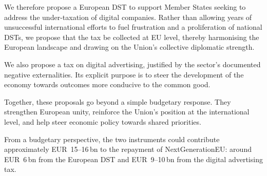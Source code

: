 \documentclass[../../main]{subfiles}
\begin{document}
We therefore propose a European DST to support Member States seeking to address the under-taxation of digital companies. Rather than allowing years of unsuccessful international efforts to fuel frustration and a proliferation of national DSTs, we propose that the tax be collected at EU level, thereby harmonising the European landscape and drawing on the Union's collective diplomatic strength.

We also propose a tax on digital advertising, justified by the sector's documented negative externalities. Its explicit purpose is to steer the development of the economy towards outcomes more conducive to the common good.

Together, these proposals go beyond a simple budgetary response. They strengthen European unity, reinforce the Union's position at the international level, and help steer economic policy towards shared priorities.

From a budgetary perspective, the two instruments could contribute approximately EUR~15--16\,bn to the repayment of NextGenerationEU: around EUR~6\,bn from the European DST and EUR~9--10\,bn from the digital advertising tax.
\end{document}
